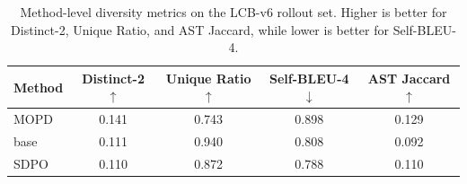 \begin{table}[t]
\centering
\small
\begin{tabular}{lcccc}
\toprule
Method & Distinct-2 $\uparrow$ & Unique Ratio $\uparrow$ & Self-BLEU-4 $\downarrow$ & AST Jaccard $\uparrow$ \\
\midrule
MOPD & 0.141 & 0.743 & 0.898 & 0.129 \\
base & 0.111 & 0.940 & 0.808 & 0.092 \\
SDPO & 0.110 & 0.872 & 0.788 & 0.110 \\
\bottomrule
\end{tabular}
\caption{Method-level diversity metrics on the LCB-v6 rollout set.
Higher is better for Distinct-2, Unique Ratio, and AST Jaccard, while lower is
better for Self-BLEU-4.}
\label{tab:diversity-metrics}
\end{table}
